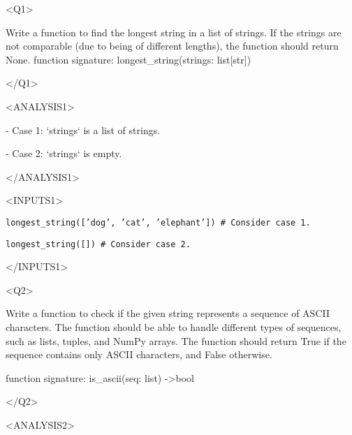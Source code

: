 \begin{tcolorbox}[
    colback=gray!10,           %
    colframe=gray!75,          %
    title=Prompt for Generating Test Input,      %
    fonttitle=\bfseries,       %
    width=\textwidth,          %
    sharp corners,             %
    boxrule=0.75mm,            %
    coltitle=black             %
]
\textless Q1\textgreater

Write a function to find the longest string in a list of strings. If the strings are not comparable (due to being of different lengths), the function should return None.
function signature: longest\_string(strings: list[str])

\textless/Q1\textgreater

\textless ANALYSIS1\textgreater

- Case 1: `strings` is a list of strings.

- Case 2: `strings` is empty.

\textless/ANALYSIS1\textgreater

\textless INPUTS1\textgreater

{\tt longest\_string(['dog', 'cat', 'elephant']) \# Consider case 1.}


{\tt longest\_string([]) \# Consider case 2.}

\textless/INPUTS1\textgreater

\textless Q2\textgreater

Write a function to check if the given string represents a sequence of ASCII characters.
The function should be able to handle different types of sequences, such as lists, tuples, and NumPy arrays.
The function should return True if the sequence contains only ASCII characters, and False otherwise.

function signature: is\_ascii(seq: list) -\textgreater bool

\textless/Q2\textgreater

\textless ANALYSIS2\textgreater

\end{tcolorbox}

